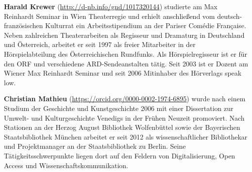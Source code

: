 \documentclass[a4paper,
fontsize=11pt,
oneside,
numbers=noperiodatend,
parskip=half-,
bibliography=totoc,
final
]{scrartcl}
\begin{document}
\textbf{Harald Krewer} (\url{http://d-nb.info/gnd/1017320144}) studierte
am Max Reinhardt Seminar in Wien Theaterregie und erhielt anschließend
vom deutsch-französischen Kulturrat ein Arbeitsstipendium an der Pariser
Comédie Française. Neben zahlreichen Theaterarbeiten als Regisseur und
Dramaturg in Deutschland und Österreich, arbeitet er seit 1997 als
freier Mitarbeiter in der Hörspielabteilung des Österreichischen
Rundfunks. Als Hörspielregisseur ist er für den ORF und verschiedene
ARD-Sendeanstalten tätig. Seit 2003 ist er Dozent am Wiener Max
Reinhardt Seminar und seit 2006 Mitinhaber des Hörverlags speak low.

\textbf{Christian Mathieu} (\url{https://orcid.org/0000-0002-1974-6895})
wurde nach einem Studium der Geschichte und Kunstgeschichte 2006 mit
einer Dissertation zur Umwelt- und Kulturgeschichte Venedigs in der
Frühen Neuzeit promoviert. Nach Stationen an der Herzog August
Bibliothek Wolfenbüttel sowie der Bayerischen Staatsbibliothek München
arbeitet er seit 2012 als wissenschaftlicher Bibliothekar und
Projektmanager an der Staatsbibliothek zu Berlin. Seine
Tätigkeitsschwerpunkte liegen dort auf den Feldern von Digitalisierung,
Open Access und Wissenschaftskommunikation.
\end{document}

